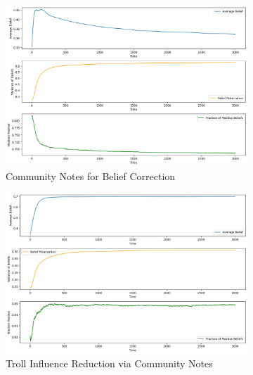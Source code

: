 \documentclass[a4paper,11pt]{scrartcl}
\begin{document}
\begin{figure}[H]
    \begin{subfigure}[b]{0.45\textwidth}
        \centering
        \includegraphics[width=\textwidth]{./images/task4_4.png}
        \caption{Community Notes for Belief Correction}
        \label{fig:task4_4}
    \end{subfigure}
    \hfill
    \begin{subfigure}[b]{0.45\textwidth}
        \centering
        \includegraphics[width=\textwidth]{./images/task4_5.png}
        \caption{Troll Influence Reduction via Community Notes}
        \label{fig:task4_5}
    \end{subfigure}

    \caption{}
    \label{fig:multiple-images}
\end{figure}
\end{document}

